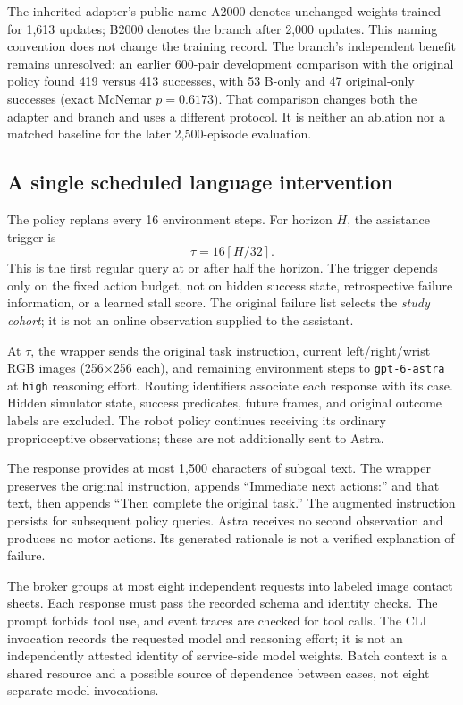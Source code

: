 \documentclass[10pt,twocolumn,letterpaper]{article}
\begin{document}
The inherited adapter's public name A2000 denotes unchanged weights trained for 1,613 updates; B2000 denotes the branch after 2,000 updates. This naming convention does not change the training record. The branch's independent benefit remains unresolved: an earlier 600-pair development comparison with the original policy found 419 versus 413 successes, with 53 B-only and 47 original-only successes (exact McNemar $p=0.6173$). That comparison changes both the adapter and branch and uses a different protocol. It is neither an ablation nor a matched baseline for the later 2,500-episode evaluation.

\subsection{A single scheduled language intervention}
The policy replans every 16 environment steps. For horizon $H$, the assistance trigger is
\begin{equation}
\tau=16\left\lceil H/32\right\rceil.
\label{eq:trigger}
\end{equation}
This is the first regular query at or after half the horizon. The trigger depends only on the fixed action budget, not on hidden success state, retrospective failure information, or a learned stall score. The original failure list selects the \emph{study cohort}; it is not an online observation supplied to the assistant.

At $\tau$, the wrapper sends the original task instruction, current left/right/wrist RGB images (256$\times$256 each), and remaining environment steps to \texttt{gpt-6-astra} at \texttt{high} reasoning effort. Routing identifiers associate each response with its case. Hidden simulator state, success predicates, future frames, and original outcome labels are excluded. The robot policy continues receiving its ordinary proprioceptive observations; these are not additionally sent to Astra.

The response provides at most 1,500 characters of subgoal text. The wrapper preserves the original instruction, appends ``Immediate next actions:'' and that text, then appends ``Then complete the original task.'' The augmented instruction persists for subsequent policy queries. Astra receives no second observation and produces no motor actions. Its generated rationale is not a verified explanation of failure.

The broker groups at most eight independent requests into labeled image contact sheets. Each response must pass the recorded schema and identity checks. The prompt forbids tool use, and event traces are checked for tool calls. The CLI invocation records the requested model and reasoning effort; it is not an independently attested identity of service-side model weights. Batch context is a shared resource and a possible source of dependence between cases, not eight separate model invocations.
\end{document}
